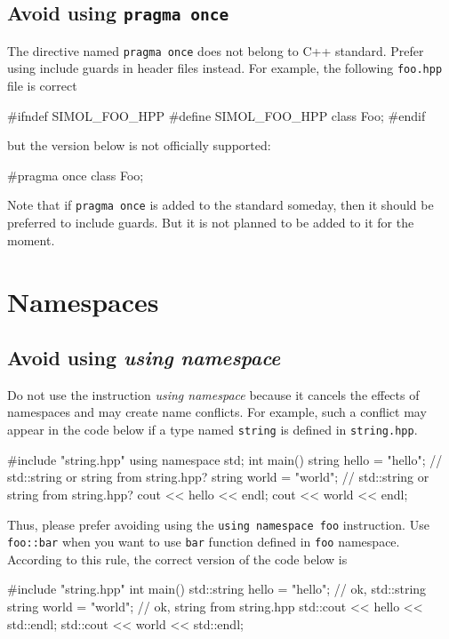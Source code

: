 \subsection{Avoid using \texttt{pragma once}}

The directive named \texttt{pragma once} does not belong to C++ standard. Prefer using include guards in header files instead. For example, the following \texttt{foo.hpp} file is correct
\begin{cppcode}
	#ifndef SIMOL_FOO_HPP
	#define SIMOL_FOO_HPP
	class Foo;
	#endif
\end{cppcode}
but the version below is not officially supported:
\begin{cppcode}
	#pragma once
	class Foo;
\end{cppcode}
Note that if \texttt{pragma once} is added to the standard someday, then it should be preferred to include guards. But it is not planned to be added to it for the moment.


\section{Namespaces}


\subsection{Avoid using \textit{using namespace}}

Do not use the instruction \textit{using namespace} because it cancels the effects of namespaces and may create name conflicts. For example, such a conflict may appear in the code below if a type named \texttt{string} is defined in \texttt{string.hpp}.

\begin{cppcode}
	#include "string.hpp"
	using namespace std;
	int main()
	{
		string hello = "hello"; // std::string or string from string.hpp?
		string world = "world"; // std::string or string from string.hpp?
		cout << hello << endl;
		cout << world << endl;
	}
\end{cppcode}

Thus, please prefer avoiding using the \texttt{using namespace foo} instruction. Use \texttt{foo::bar} when you want to use \texttt{bar} function defined in \texttt{foo} namespace. According to this rule, the correct version of the code below is
\begin{cppcode}
	#include "string.hpp"
	int main()
	{
		std::string hello = "hello"; // ok, std::string
		string world = "world"; // ok, string from string.hpp
		std::cout << hello << std::endl;
		std::cout << world << std::endl;
	}
\end{cppcode}

